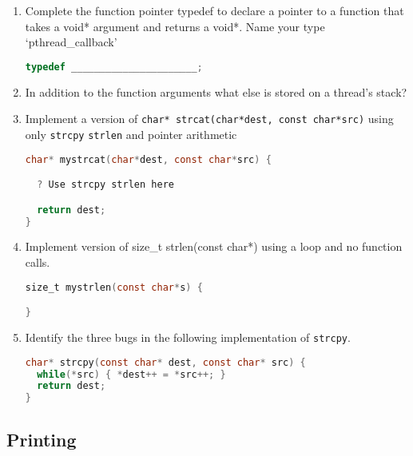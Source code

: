 \begin{enumerate}
\item Complete the function pointer typedef to declare a pointer to a function that takes a void* argument and returns a void*. Name your type `pthread\_callback'

\begin{lstlisting}[language=C]
typedef ______________________;
\end{lstlisting}

\item In addition to the function arguments what else is stored on a thread's stack?

\item Implement a version of \texttt{char*\ strcat(char*dest,\ const\ char*src)} using only \texttt{strcpy} \texttt{strlen} and pointer arithmetic

\begin{lstlisting}[language=C]
char* mystrcat(char*dest, const char*src) {

  ? Use strcpy strlen here

  return dest;
}
\end{lstlisting}

\item Implement version of size\_t strlen(const char*) using a loop and no function calls.

\begin{lstlisting}[language=C]
size_t mystrlen(const char*s) {

}
\end{lstlisting}

\item Identify the three bugs in the following implementation of \texttt{strcpy}.

\begin{lstlisting}[language=C]
char* strcpy(const char* dest, const char* src) {
  while(*src) { *dest++ = *src++; }
  return dest;
}
\end{lstlisting}

\end{enumerate}

\subsection{Printing}

